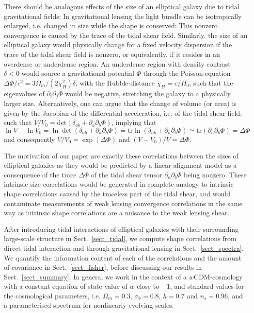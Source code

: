 \documentclass[a4paper,fleqn,usenatbib]{mnras}
\begin{document}
There should be analogous effects of the size of an elliptical galaxy due to tidal gravitational fields: In gravitational lensing the light bundle can be isotropically enlarged, i.e. changed in size while the shape is conserved: This nonzero convergence is caused by the trace of the tidal shear field. Similarly, the size of an elliptical galaxy would physically change for a fixed velocity dispersion if the trace of the tidal shear field is nonzero, or equivalently, if it resides in an overdense or underdense region. An underdense region with density contrast $\delta < 0$ would source a gravitational potential $\Phi$ through the Poisson-equation $\Delta\Phi/c^2 = 3\Omega_m/(2\chi_H^2)\delta$, with the Hubble-distance $\chi_H = c/H_0$, such that the eigenvalues of $\partial_i\partial_j\Phi$ would be negative, stretching the galaxy to a physically larger size. Alternatively, one can argue that the change of volume (or area) is given by the Jacobian of the differential acceleration, i.e. of the tidal shear field, such that $V/V_0 = \mathrm{det}(\delta_{ab} + \partial_a\partial_b\Phi)$, implying that $\ln V-\ln V_0 = \ln\det(\delta_{ab} + \partial_a\partial_b\Phi) = \mathrm{tr}\ln(\delta_{ab} + \partial_a\partial_b\Phi) \simeq \mathrm{tr}(\partial_a\partial_b\Phi) = \Delta\Phi$ and consequently $V/V_0 = \exp(\Delta\Phi)$ and $(V-V_0)/V = \Delta\Phi$.

The motivation of our paper are exactly these correlations between the sizes of elliptical galaxies as they would be predicted by a linear alignment model as a consequence of the trace $\Delta\Phi$ of the tidal shear tensor $\partial_a\partial_b\Phi$ being nonzero. These intrinsic size correlations would be generated in complete analogy to intrinsic shape correlations caused by the traceless part of the tidal shear, and would contaminate measurements of weak lensing convergence correlations in the same way as intrinsic shape correlations are a nuisance to the weak lensing shear.

After introducing tidal interactions of elliptical galaxies with their surrounding large-scale structure in Sect.~\ref{sect_tidal}, we compute shape correlations from direct tidal interaction and through gravitational lensing in Sect.~\ref{sect_spectra}. We quantify the information content of each of the correlations and the amount of covariance in Sect.~\ref{sect_fisher}, before discussing our results in Sect.~\ref{sect_summary}. In general we work in the context of a $w$CDM-cosmology with a constant equation of state value of $w$ close to $-1$, and standard values for the cosmological parameters, i.e. $\Omega_m = 0.3$, $\sigma_8 =  0.8$, $h = 0.7$ and $n_s = 0.96$, and a parameterised spectrum for nonlinearly evolving scales.
\end{document}
